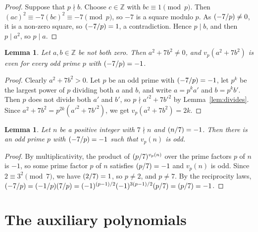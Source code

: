 \documentclass[11pt]{article}
\newtheorem{lemma}[theorem]{Lemma}
\newcommand{\Z}{\mathbb{Z}}
\newcommand{\leg}[2]{\mathchoice{\biggl(\dfrac{#1}{#2}\biggr)}{(#1/#2)}{(#1/#2)}{(#1/#2)}}
\begin{document}
\begin{proof}
Suppose that $p\nmid b$. Choose $c\in\Z$ with $bc\equiv1\pmod p$. Then $(ac)^2\equiv-7(bc)^2\equiv-7\pmod p$, so $-7$ is a square modulo $p$. As $\leg{-7}{p}\neq0$, it is a non-zero square, so $\leg{-7}{p}=1$, a contradiction. Hence $p\mid b$, and then $p\mid a^2$, so $p\mid a$.
\end{proof}

\begin{lemma}\label{lem:even}
Let $a,b\in\Z$ be not both zero. Then $a^2+7b^2\neq0$, and $v_p(a^2+7b^2)$ is even for every odd prime $p$ with $\leg{-7}{p}=-1$.
\end{lemma}

\begin{proof}
Clearly $a^2+7b^2>0$. Let $p$ be an odd prime with $\leg{-7}{p}=-1$, let $p^k$ be the largest power of $p$ dividing both $a$ and $b$, and write $a=p^ka'$ and $b=p^kb'$. Then $p$ does not divide both $a'$ and $b'$, so $p\nmid a'^2+7b'^2$ by Lemma~\ref{lem:divides}. Since $a^2+7b^2=p^{2k}(a'^2+7b'^2)$, we get $v_p(a^2+7b^2)=2k$.
\end{proof}

\begin{lemma}\label{lem:odd}
Let $n$ be a positive integer with $7\nmid n$ and $\leg{n}{7}=-1$. Then there is an odd prime $p$ with $\leg{-7}{p}=-1$ such that $v_p(n)$ is odd.
\end{lemma}

\begin{proof}
By multiplicativity, the product of $\leg{p}{7}^{v_p(n)}$ over the prime factors $p$ of $n$ is $-1$, so some prime factor $p$ of $n$ satisfies $\leg{p}{7}=-1$ and $v_p(n)$ is odd. Since $2\equiv3^2\pmod7$, we have $\leg{2}{7}=1$, so $p\neq2$, and $p\neq7$. By the reciprocity laws, $\leg{-7}{p}=\leg{-1}{p}\leg{7}{p}=(-1)^{(p-1)/2}(-1)^{3(p-1)/2}\leg{p}{7}=\leg{p}{7}=-1$.
\end{proof}

\section{The auxiliary polynomials}
\end{document}
